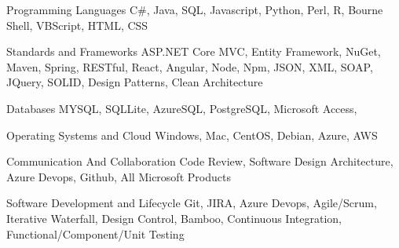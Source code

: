 

\begin{cvskills}

    \cvskill
    {Programming Languages} %
    {C\#, Java, SQL, Javascript, Python, Perl, R, Bourne Shell, VBScript, HTML, CSS} %

    \cvskill
    {Standards and Frameworks} %
    {ASP.NET Core MVC, Entity Framework, NuGet, Maven, Spring, RESTful, React, Angular, Node, Npm, JSON, XML, SOAP, JQuery, SOLID, Design Patterns, Clean Architecture} %

    \cvskill
    {Databases} %
    {MYSQL, SQLLite, AzureSQL, PostgreSQL, Microsoft Access,} %

    \cvskill
    {Operating Systems and Cloud} %
    {Windows, Mac, CentOS, Debian, Azure, AWS} %

    \cvskill
    {Communication And Collaboration} %
    {Code Review, Software Design Architecture, Azure Devops, Github, All Microsoft Products} %

    \cvskill
    {Software Development and Lifecycle} %
    {Git, JIRA, Azure Devops, Agile/Scrum, Iterative Waterfall, Design Control, Bamboo, Continuous Integration, Functional/Component/Unit Testing} %

\end{cvskills}